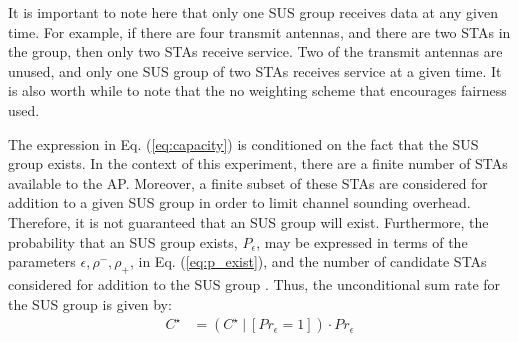 It is important to note here that only one SUS group receives data at any given time. For example, if there are four transmit antennas, and there are two STAs in the group, then only two STAs receive service. Two of the transmit antennas are unused, and only one SUS group of two STAs receives service at a given time. It is also worth while to note that the no weighting scheme that encourages fairness used.

The expression in Eq. (\ref{eq:capacity}) is conditioned on the fact that the SUS group exists. In the context of this experiment, there are a finite number of STAs available to the AP. Moreover, a finite subset of these STAs are considered for addition to a given SUS group in order to limit channel sounding overhead. Therefore, it is not guaranteed that an SUS group will exist. Furthermore, the probability that an SUS group exists, $P_{\epsilon}$, may be expressed in terms of the parameters $\epsilon,\rho^-,\rho_+$, in Eq. (\ref{eq:p_exist}), and the number of candidate STAs considered for addition to the SUS group \cite{Swannack2005}. Thus, the unconditional sum rate for the SUS group is given by:
\begin{equation}\label{eq:sum_rate}
    \begin{aligned}
        C^{\star} &=  (C^{\star} \ \vert \ [Pr_\epsilon = 1])\cdot Pr_\epsilon
    \end{aligned}
\end{equation}






